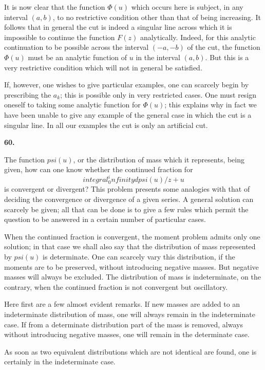 \documentclass[
  paper=b5,
  fontsize=13pt,
  twoside,
  headings=normal,
  bookmarkpackage=false
]{scrartcl}
\theoremstyle{stieltjesplain}
\theoremstyle{stieltjesdefinition}
\def\int{integral}%
\def\frac#1#2{#1/#2}%
\def\psi{psi}%
\def\infty{infinity}%
\newcommand{\origsection}[1]{%
  \par\addvspace{0.85\baselineskip}%
  \phantomsection\label{sec:#1}%
  \addcontentsline{toc}{subsection}{\texorpdfstring{\S~#1}{Section #1}}%
  \noindent\textbf{#1.}\quad\ignorespaces
}
\begin{document}
It is now clear that the function $\Phi(u)$ which occurs here is subject, in any interval $(a,b)$, to no restrictive condition other than that of being increasing. It follows that in general the cut is indeed a singular line across which it is impossible to continue the function $F(z)$ analytically. Indeed, for this analytic continuation to be possible across the interval $(-a,-b)$ of the cut, the function $\Phi(u)$ must be an analytic function of $u$ in the interval $(a,b)$. But this is a very restrictive condition which will not in general be satisfied.

If, however, one wishes to give particular examples, one can scarcely begin by prescribing the $a_k$; this is possible only in very restricted cases. One must resign oneself to taking some analytic function for $\Phi(u)$; this explains why in fact we have been unable to give any example of the general case in which the cut is a singular line. In all our examples the cut is only an artificial cut.

\origsection{60}
The function $\psi(u)$, or the distribution of mass which it represents, being given, how can one know whether the continued fraction for
\[
  \int_0^\infty\frac{d\psi(u)}{z+u}
\]
is convergent or divergent? This problem presents some analogies with that of deciding the convergence or divergence of a given series. A general solution can scarcely be given; all that can be done is to give a few rules which permit the question to be answered in a certain number of particular cases.

When the continued fraction is convergent, the moment problem admits only one solution; in that case we shall also say that the distribution of mass represented by $\psi(u)$ is determinate. One can scarcely vary this distribution, if the moments are to be preserved, without introducing negative masses. But negative masses will always be excluded. The distribution of mass is indeterminate, on the contrary, when the continued fraction is not convergent but oscillatory.

Here first are a few almost evident remarks. If new masses are added to an indeterminate distribution of mass, one will always remain in the indeterminate case. If from a determinate distribution
part of the mass is removed, always without introducing negative masses, one will remain in the determinate case.

As soon as two equivalent distributions which are not identical are found, one is certainly in the indeterminate case.
\end{document}
